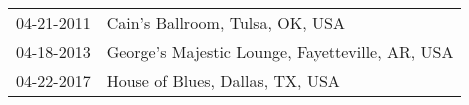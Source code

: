 \begin{supertabular}{ll}
 04-21-2011 &                  Cain's Ballroom, Tulsa, OK, USA \\
 04-18-2013 &  George's Majestic Lounge, Fayetteville, AR, USA \\
 04-22-2017 &                  House of Blues, Dallas, TX, USA \\
\end{supertabular}
